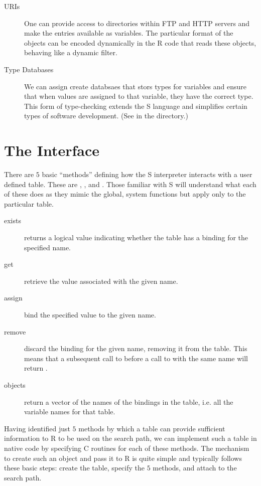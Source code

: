 \documentclass{article}
\begin{document}
\begin{description}
\item[URIs]
 One can provide access to directories within FTP and HTTP servers 
 and make the entries available as variables. The particular format
 of the objects can be encoded dynamically in the R code that reads
 these objects, behaving like a dynamic filter.

\item[Type Databases] We can assign create databsaes that stors types
  for variables and ensure that when values are assigned to that
  variable, they have the correct type.  This form of type-checking
  extends the S language and simplifies certain types of software
  development.  (See  in the 
  directory.)
\end{description}



\section{The Interface}

There are $5$ basic ``methods'' defining how the S interpreter
interacts with a user defined table.  These are ,
 ,  and
.
Those familiar with S will understand what each of these does
as they mimic the global, system functions
but apply only to the particular table.
\begin{description}
\item[exists] 
 returns a logical value indicating whether the table
 has a binding for the specified name.
\item[get]
  retrieve the value associated with the given name.
\item[assign]
  bind the specified value to the given name.
\item[remove]
  discard the binding for the given name,
  removing it from the table.
  This means that a subsequent call to 
  before a call to  with the same name
  will return \SFalse.
\item[objects]
  return a vector of the names of the bindings in the 
  table, i.e. all the variable names for that table.
\end{description}

Having identified just $5$ methods by which a table can provide
sufficient information to R to be used on the search path, we can
implement such a table in native code by specifying C routines for
each of these methods.  The mechanism to create such an object and
pass it to R is quite simple and typically follows
these basic steps: create the table, specify the $5$ methods,
and attach to the search path.
\end{document}
